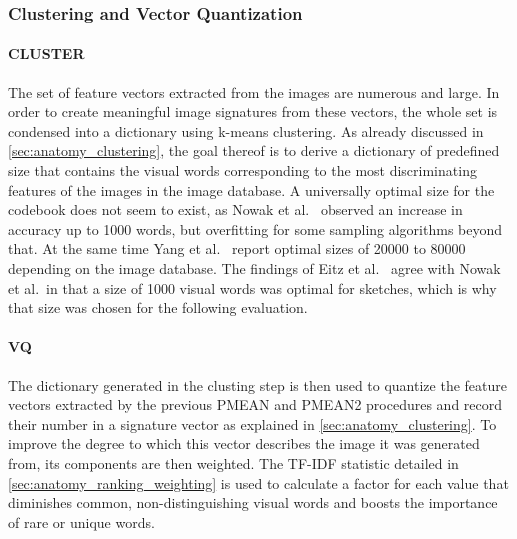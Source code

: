 \subsubsection{Clustering and Vector Quantization}

\paragraph{CLUSTER}

The set of feature vectors extracted from the images are numerous and large.
In order to create meaningful image signatures from these vectors, the whole
set is condensed into a dictionary using k-means clustering. As already
discussed in \autoref{sec:anatomy_clustering}, the goal thereof is to derive a
dictionary of predefined size that contains the visual words corresponding to
the most discriminating features of the images in the image database. A
universally optimal size for the codebook does not seem to exist, as Nowak et
al.\ \autocite{nowak_sampling_2006} observed an increase in accuracy up to 1000
words, but overfitting for some sampling algorithms beyond that. At the same
time Yang et al.\ \autocite{yang_evaluating_2007} report optimal sizes of 20000
to 80000 depending on the image database. The findings of Eitz et al.\
\autocite{eitz_sketch-based_2011} agree with Nowak et al.\ in that a size of
1000 visual words was optimal for sketches, which is why that size was chosen
for the following evaluation.

\paragraph{VQ}

The dictionary generated in the clusting step is then used to quantize the
feature vectors extracted by the previous PMEAN and PMEAN2 procedures and
record their number in a signature vector as explained in
\autoref{sec:anatomy_clustering}. To improve the degree to which this vector
describes the image it was generated from, its components are then weighted.
The TF-IDF statistic detailed in \autoref{sec:anatomy_ranking_weighting} is
used to calculate a factor for each value that diminishes common,
non-distinguishing visual words and boosts the importance of rare or unique
words.
